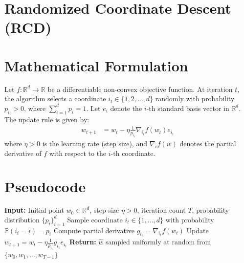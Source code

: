 \documentclass{article}
\begin{document}
\section*{Randomized Coordinate Descent (RCD)}
\section*{Mathematical Formulation}
Let $f: \mathbb{R}^d \to \mathbb{R}$ be a differentiable non-convex objective function. At iteration $t$, the algorithm selects a coordinate $i_t \in \{1, 2, \dots, d\}$ randomly with probability $p_{i_t} > 0$, where $\sum_{i=1}^d p_i = 1$. Let $e_i$ denote the $i$-th standard basis vector in $\mathbb{R}^d$. The update rule is given by:
\begin{align*}
w_{t+1} &= w_t - \eta \frac{1}{p_{i_t}} \nabla_{i_t} f(w_t) e_{i_t}
\end{align*}
where $\eta > 0$ is the learning rate (step size), and $\nabla_{i} f(w)$ denotes the partial derivative of $f$ with respect to the $i$-th coordinate.

\section*{Pseudocode}
\begin{algorithm}[H]
\caption{Randomized Coordinate Descent for Non-Convex Optimization}
\begin{algorithmic}[1]
\State \textbf{Input:} Initial point $w_0 \in \mathbb{R}^d$, step size $\eta > 0$, iteration count $T$, probability distribution $\{p_i\}_{i=1}^d$
    \State Sample coordinate $i_t \in \{1, \dots, d\}$ with probability $\mathbb{P}(i_t = i) = p_i$
    \State Compute partial derivative $g_{i_t} = \nabla_{i_t} f(w_t)$
    \State Update $w_{t+1} = w_t - \eta \frac{1}{p_{i_t}} g_{i_t} e_{i_t}$
\EndFor
\State \textbf{Return:} $\hat{w}$ sampled uniformly at random from $\{w_0, w_1, \dots, w_{T-1}\}$
\end{algorithmic}
\end{algorithm}
\end{document}
